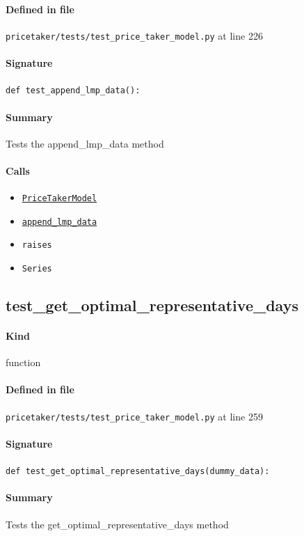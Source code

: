 \documentclass[11pt]{report}
\begin{document}
\paragraph{Defined in file} \texttt{pricetaker/tests/test\_price\_taker\_model.py} at line 226
\paragraph{Signature} \texttt{def test\_append\_lmp\_data():}
\paragraph{Summary} Tests the append\_lmp\_data method
\paragraph{Calls}
\begin{itemize}[leftmargin=*]
  \item \hyperref[def:pricetaker-price_taker_model.py:PriceTakerModel:L161]{\texttt{PriceTakerModel}}
  \item \hyperref[def:pricetaker-price_taker_model.py:PriceTakerModel.append_lmp_data:L221]{\texttt{append\_lmp\_data}}
  \item \texttt{raises}
  \item \texttt{Series}
\end{itemize}
\subsection{test\_get\_optimal\_representative\_days}
\label{def:pricetaker-tests-test_price_taker_model.py:test_get_optimal_representative_days:L259}
\paragraph{Kind} function
\paragraph{Defined in file} \texttt{pricetaker/tests/test\_price\_taker\_model.py} at line 259
\paragraph{Signature} \texttt{def test\_get\_optimal\_representative\_days(dummy\_data):}
\paragraph{Summary} Tests the get\_optimal\_representative\_days method
\end{document}
